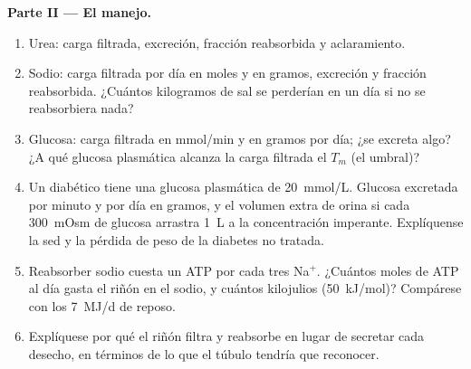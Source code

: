 \begin{problem}
\medskip
\noindent\textbf{Parte II --- El manejo.}
\begin{enumerate}[resume]
  \item Urea: carga filtrada, excreción, fracción reabsorbida y
        aclaramiento.
  \item Sodio: carga filtrada por día en moles y en gramos, excreción y
        fracción reabsorbida. ¿Cuántos kilogramos de sal se perderían
        en un día si no se reabsorbiera nada?
  \item Glucosa: carga filtrada en mmol/min y en gramos por día; ¿se
        excreta algo? ¿A qué glucosa plasmática alcanza la carga
        filtrada el $T_{m}$ (el umbral)?
  \item Un diabético tiene una glucosa plasmática de \qty{20}{mmol/L}.
        Glucosa excretada por minuto y por día en gramos, y el volumen
        extra de orina si cada \qty{300}{mOsm} de glucosa arrastra
        \qty{1}{L} a la concentración imperante. Explíquense la sed y
        la pérdida de peso de la diabetes no tratada.
  \item Reabsorber sodio cuesta un ATP por cada tres Na$^{+}$. ¿Cuántos
        moles de ATP al día gasta el riñón en el sodio, y cuántos
        kilojulios (\qty{50}{kJ/mol})? Compárese con los \qty{7}{MJ/d}
        de reposo.
  \item Explíquese por qué el riñón filtra y reabsorbe en lugar de
        secretar cada desecho, en términos de lo que el túbulo tendría
        que reconocer.
\end{enumerate}


\end{problem}
